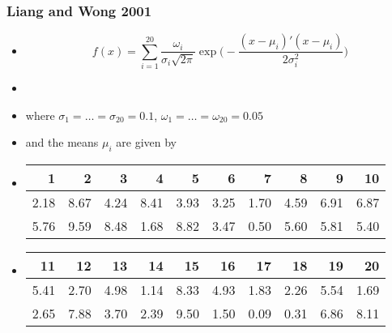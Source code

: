\begin{frame}
		\frametitle{Liang and Wong 2001}
	
	\begin{itemize}
		\item[] $$ f(x) = 
			\sum_{i=1}^{20} \frac{\omega_i}{ \sigma_i \sqrt{2 \pi} } \exp \Big( -\frac{(x - \mu_i)'(x - \mu_i)}{2 \sigma_i^2} \Big) $$

		\item[]
		\item[] where $\sigma_1 = \dots = \sigma_{20} = 0.1$, $\omega_1 = \dots = \omega_{20} = 0.05 $
		\item[] and the means $\mu_i$ are given by

		\item[] 
\begin{table}[ht]
\centering
\begin{tabular}{rrrrrrrrrr}
  \hline
1 & 2 & 3 & 4 & 5 & 6 & 7 & 8 & 9 & 10 \\ 
  \hline
2.18 & 8.67 & 4.24 & 8.41 & 3.93 & 3.25 & 1.70 & 4.59 & 6.91 & 6.87 \\ 
  5.76 & 9.59 & 8.48 & 1.68 & 8.82 & 3.47 & 0.50 & 5.60 & 5.81 & 5.40 \\ 
   \hline
\end{tabular}
\end{table}

		\item[]
\begin{table}[ht]
\centering
\begin{tabular}{rrrrrrrrrr}
  \hline
11 & 12 & 13 & 14 & 15 & 16 & 17 & 18 & 19 & 20 \\ 
  \hline
5.41 & 2.70 & 4.98 & 1.14 & 8.33 & 4.93 & 1.83 & 2.26 & 5.54 & 1.69 \\ 
  2.65 & 7.88 & 3.70 & 2.39 & 9.50 & 1.50 & 0.09 & 0.31 & 6.86 & 8.11 \\ 
   \hline
\end{tabular}
\end{table}
	\end{itemize} 	

			
\end{frame}
	

